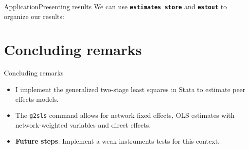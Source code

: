 \documentclass[aspectratio=169]{beamer}
\begin{document}
\begin{frame}{Application}{Presenting results}
We can use \textbf{\texttt{estimates store}} and \textbf{\texttt{estout}} to organize our results:\\
\vspace{0.37cm}
\centering
{}
\end{frame}


\section{Concluding remarks}

\begin{frame}{Concluding remarks}
\begin{itemize}
\item I implement the generalized two-stage least squares in Stata to estimate peer effects models.
\item The \texttt{g2sls} command allows for network fixed effects, OLS estimates with network-weighted variables and direct effects.
\item \textbf{Future steps}: Implement a weak instruments tests for this context.
\end{itemize}
\end{frame}
\end{document}
